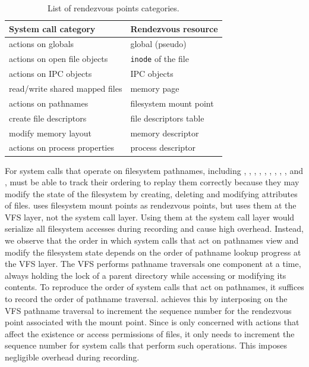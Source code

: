 \begin{table}[]
\begin{table}[]
\begin{center}
\begin{tabular}{|l|l|}
  \hline
  {\bf System call category}     & {\bf Rendezvous resource} \\ \hline
  actions on globals             & global (pseudo)           \\ \hline
  actions on open file objects   & {\tt inode} of the file   \\ \hline
  actions on IPC objects         & IPC objects               \\ \hline
  read/write shared mapped files & memory page               \\ \hline
  actions on pathnames           & filesystem mount point    \\ \hline
  create file descriptors        & file descriptors table    \\ \hline
  modify memory layout           & memory descriptor         \\ \hline
  actions on process properties  & process descriptor        \\ \hline
\end{tabular}
\end{center}
\caption{List of rendezvous points categories.}
\label{scribe:tab:rendezvous}
\end{table}

For system calls that operate on filesystem pathnames, including
, , , , ,
, , , , and
, \scribe{} must be able to track their ordering to
replay them correctly because they may modify the state of the
filesystem by creating, deleting and modifying attributes of files.
\scribe{} uses filesystem mount points as rendezvous points, but uses
them at the VFS layer, not the system call
layer.  Using them at the system call layer would serialize
all filesystem accesses during recording and cause high overhead.
Instead, we observe that the order in which system calls that act 
on pathnames view and modify the filesystem state depends on
the order of pathname lookup progress at the 
VFS layer.  The VFS performs pathname traversals one component at a
time, always holding the lock of a parent directory while accessing or
modifying its contents.  To reproduce the order of system calls
that act on pathnames, it suffices to record the order of pathname 
traversal.  \scribe{} achieves this by interposing on the VFS pathname
traversal to increment the sequence number for the rendezvous point
associated with the mount point.  Since \scribe{} is only concerned
with actions that affect the existence or access permissions of files,
it only needs to increment the sequence number for system calls
that perform such operations.  This imposes negligible overhead during
recording.  


\end{table}
